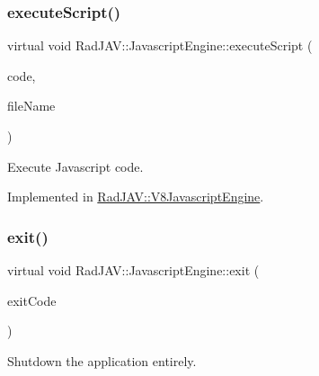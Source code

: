 \mbox{\label{class_rad_j_a_v_1_1_javascript_engine_a4cdc81e5c398f7f1a2ce3ff45f135792}} 
\subsubsection{\texorpdfstring{execute\+Script()}{executeScript()}}
{\footnotesize\ttfamily virtual void Rad\+J\+A\+V\+::\+Javascript\+Engine\+::execute\+Script (\begin{DoxyParamCaption}\item[{\mbox{\hyperlink{class_rad_j_a_v_1_1_string}{String}}}]{code,  }\item[{\mbox{\hyperlink{class_rad_j_a_v_1_1_string}{String}}}]{file\+Name }\end{DoxyParamCaption})\hspace{0.3cm}{\ttfamily [pure virtual]}}



Execute Javascript code. 



Implemented in \mbox{\hyperlink{class_rad_j_a_v_1_1_v8_javascript_engine_ac45d45c9a25fe8f0f9e90fe21e8ef035}{Rad\+J\+A\+V\+::\+V8\+Javascript\+Engine}}.

\mbox{\label{class_rad_j_a_v_1_1_javascript_engine_a4a720b2e36ab737ab0b697e9b7317fb0}} 
\subsubsection{\texorpdfstring{exit()}{exit()}}
{\footnotesize\ttfamily virtual void Rad\+J\+A\+V\+::\+Javascript\+Engine\+::exit (\begin{DoxyParamCaption}\item[{R\+J\+I\+NT}]{exit\+Code }\end{DoxyParamCaption})\hspace{0.3cm}{\ttfamily [pure virtual]}}



Shutdown the application entirely. 



